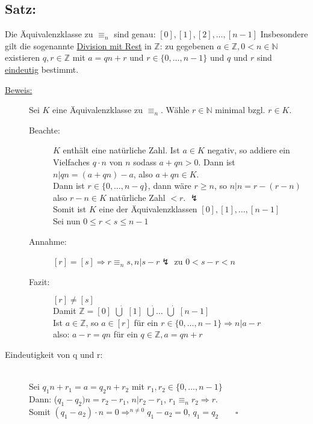 \subsection{Satz:} 
Die Äquivalenzklasse zu $\equiv_{n}$ sind genau: $[0], [1], [2], \dotsc  , [n-1]$ Insbesondere gilt die sogenannte \underline{Division mit Rest} in $\mathbb{Z}$: zu gegebenen $a \in \mathbb{Z}, 0 < n \in \mathbb{N}$ existieren $q, r \in \mathbb{Z}$ mit $ a= qn+r$ und $r \in \{0,\dotsc  , n-1\}$ und $q$ und $r$ sind \underline{eindeutig} bestimmt.

\begin{description}
	\item[\underline{Beweis:}] Sei $K$ eine Äquivalenzklasse zu $\equiv_{n}$. Wähle $r \in \mathbb{N}$ minimal bzgl. $r \in 
					K$. 
	\begin{description}
		\item[Beachte:] $K$ enthält eine natürliche Zahl. Ist $ a\in K$ negativ, so addiere ein Vielfaches $q\cdot n$ von $n$ 
					sodass $a+qn > 0$. Dann ist $n|qn=(a+qn)-a$, also $a+qn \in K$. \\
					Dann ist $r \in \{0,\dotsc  , n-q\}$, dann wäre $r \geq n$, so $n|n=r-(r-n)$ also $r-n\in K$ 
					 natürliche Zahl $< r$. $\lightning$\\
					Somit ist $K$ eine der Äquivalenzklassen $[0], [1], \dotsc  , [n-1]$\\
					Sei nun $0 \leq r < s \leq n-1$
		\item[Annahme:] $[r] = [s] \Rightarrow r\equiv_{n} s, n| s-r\lightning$ zu $0 < s-r < n$
		\item[Fazit:] $[r] \neq [s]$ \\
				Damit $\mathbb{Z} = [0]$ $\dot{\bigcup}$ $[1]$ $\dot{\bigcup} \dotsc   $ $\dot{\bigcup}$ $[n-1]$ \\
				Ist $ a \in \mathbb{Z}$, so $a \in [r]$ für ein $r \in \{ 0, \dotsc  , n-1\} \Rightarrow n|a-r$ \\
				also: $a-r=qn$ für ein $q \in \mathbb{Z}, a =qn+r$
	\end{description}
	\item[Eindeutigkeit von q und r:] \qquad\\
						Sei $q_{1}n+r_{1}=a=q_{2}n+r_{2}$ mit $r_{1}, r_{2} \in \{0, \dotsc  , n-1\}$ \\
						Dann: ($q_{1}-q_{2})n=r_{2}-r_{1}$, $n|r_{2}-r_{1}$, $r_{1}\equiv_{n} r_{2} 
						\Rightarrow r$.\\
						Somit $(q_{1} -a_{2}) \cdot n = 0 \Rightarrow^{n\neq 0} q_{1}-a_{2} = 0$, $q_{1} 
						= q_{2} \qquad \square$\\
\end{description}
%
%
%
